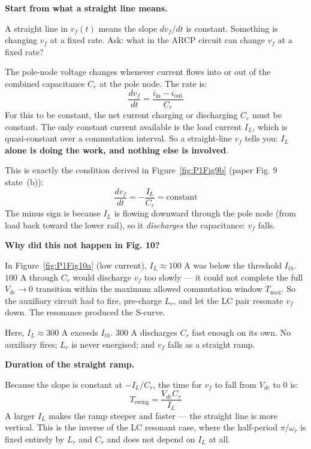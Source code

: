 \documentclass[12pt, a4paper]{article}
\def\,{ }%
\newcommand{\Vdc}{V_{dc}}
\newcommand{\vf}{v_f}
\newcommand{\IL}{I_L}
\newcommand{\Lr}{L_r}
\newcommand{\omegar}{\omega_r}
\newcommand{\Ith}{I_{th}}
\newcommand{\figref}[1]{Figure~\ref{#1}}
\begin{document}
\textbf{Start from what a straight line means.}

A straight line in $\vf(t)$ means the slope $d\vf/dt$ is constant.
Something is changing $\vf$ at a fixed rate.
Ask: what in the ARCP circuit can change $\vf$ at a fixed rate?

The pole-node voltage changes whenever current flows into or out of the
combined capacitance $C_r$ at the pole node.
The rate is:
\begin{equation}
    \frac{d\vf}{dt} = \frac{i_\text{in} - i_\text{out}}{C_r}
\end{equation}
For this to be constant, the net current charging or discharging $C_r$
must be constant.
The only constant current available is the load current $\IL$, which is
quasi-constant over a commutation interval.
So a straight-line $\vf$ tells you: \textbf{$\IL$ alone is doing the work,
and nothing else is involved}.

This is exactly the condition derived in \figref{fig:P1Fig9b}
(paper Fig.\,9 state~(b)):
\begin{equation}
    \frac{d\vf}{dt} = -\frac{\IL}{C_r} = \text{constant}
    \label{eq:straight_ramp_Fig11}
\end{equation}
The minus sign is because $\IL$ is flowing downward through the pole node
(from load back toward the lower rail), so it \emph{discharges} the
capacitance: $\vf$ falls.

\medskip
\textbf{Why did this not happen in Fig.\,10?}

In \figref{fig:P1Fig10a} (low current), $\IL \approx 100$\,A was below the
threshold $\Ith$.
$100$\,A through $C_r$ would discharge $\vf$ too slowly --- it could not
complete the full $\Vdc \to 0$ transition within the maximum allowed
commutation window $T_\text{max}$.
So the auxiliary circuit had to fire, pre-charge $\Lr$, and let the LC pair
resonate $\vf$ down.
The resonance produced the S-curve.

Here, $\IL \approx 300$\,A exceeds $\Ith$.
$300$\,A discharges $C_r$ fast enough on its own.
No auxiliary fires; $\Lr$ is never energised; and $\vf$ falls as a straight
ramp.

\medskip
\textbf{Duration of the straight ramp.}

Because the slope is constant at $-\IL/C_r$, the time for $\vf$ to fall
from $\Vdc$ to $0$ is:
\begin{equation}
    T_\text{swing} = \frac{\Vdc\,C_r}{\IL}
    \label{eq:Tswing_Fig11}
\end{equation}
A larger $\IL$ makes the ramp steeper and faster --- the straight line is
more vertical.
This is the inverse of the LC resonant case, where the half-period
$\pi/\omegar$ is fixed entirely by $\Lr$ and $C_r$ and does not depend on
$\IL$ at all.
\end{document}

